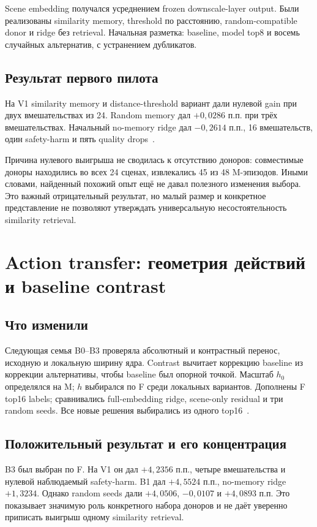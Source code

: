 \documentclass[11pt,a4paper]{article}
\begin{document}
Scene embedding получался усреднением frozen downscale-layer output. Были реализованы similarity memory, threshold по расстоянию, random-compatible donor и ridge без retrieval. Начальная разметка: baseline, model top8 и восемь случайных альтернатив, с устранением дубликатов.

\subsection{Результат первого пилота}
На V1 similarity memory и distance-threshold вариант дали нулевой gain при двух вмешательствах из 24. Random memory дал $+0{,}0286$ п.п. при трёх вмешательствах. Начальный no-memory ridge дал $-0{,}2614$ п.п., 16 вмешательств, один safety-harm и пять quality drops~\cite{initial}.

Причина нулевого выигрыша не сводилась к отсутствию доноров: совместимые доноры находились во всех 24 сценах, извлекались 45 из 48 M-эпизодов. Иными словами, найденный похожий опыт ещё не давал полезного изменения выбора. Это важный отрицательный результат, но малый размер и конкретное представление не позволяют утверждать универсальную несостоятельность similarity retrieval.

\section{Action transfer: геометрия действий и baseline contrast}
\subsection{Что изменили}
Следующая семья B0--B3 проверяла абсолютный и контрастный перенос, исходную и локальную ширину ядра. Contrast вычитает коррекцию baseline из коррекции альтернативы, чтобы baseline был опорной точкой. Масштаб $h_0$ определялся на M; $h$ выбирался по F среди локальных вариантов. Дополнены F top16 labels; сравнивались full-embedding ridge, scene-only residual и три random seeds. Все новые решения выбирались из одного top16~\cite{action}.

\subsection{Положительный результат и его концентрация}
B3 был выбран по F. На V1 он дал $+4{,}2356$ п.п., четыре вмешательства и нулевой наблюдаемый safety-harm. B1 дал $+4{,}5524$ п.п., no-memory ridge $+1{,}3234$. Однако random seeds дали $+4{,}0506$, $-0{,}0107$ и $+4{,}0893$ п.п. Это показывает значимую роль конкретного набора доноров и не даёт уверенно приписать выигрыш одному similarity retrieval.
\end{document}
